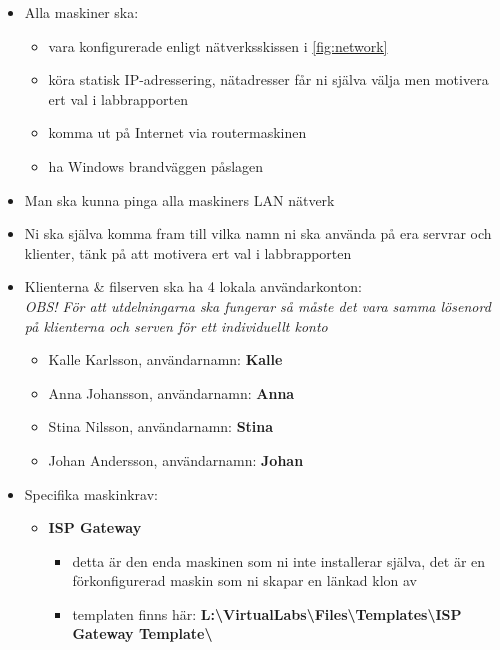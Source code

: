 \documentclass[paper=a4, fontsize=11pt]{report} %
\begin{document}
\begin{itemize}
    \item Alla maskiner ska:
    \begin{itemize}
        \item vara konfigurerade enligt nätverksskissen i \figurename \ref{fig:network}
        \item köra statisk IP-adressering, nätadresser får ni själva välja men motivera ert val i labbrapporten
        \item komma ut på Internet via routermaskinen
        \item ha Windows brandväggen påslagen
    \end{itemize}
    \item Man ska kunna pinga alla maskiners LAN nätverk
    \item Ni ska själva komma fram till vilka namn ni ska använda på era servrar och klienter, tänk på att motivera ert val i labbrapporten
    \item Klienterna \& filserven ska ha 4 lokala användarkonton: \\ \textit{OBS! För att utdelningarna ska fungerar så måste det vara samma lösenord på klienterna och serven för ett individuellt konto}
    \begin{itemize}
        \item Kalle Karlsson, användarnamn: \textbf{Kalle}
        \item Anna Johansson, användarnamn: \textbf{Anna}
        \item Stina Nilsson, användarnamn: \textbf{Stina}
        \item Johan Andersson, användarnamn: \textbf{Johan}
    \end{itemize}
    \item Specifika maskinkrav:
    \begin{itemize}
        \item \textbf{ISP Gateway}
        \begin{itemize}
            \item detta är den enda maskinen som ni inte installerar själva, det är en förkonfigurerad maskin som ni skapar en länkad klon av
            \item templaten finns här: \textbf{L:\textbackslash VirtualLabs\textbackslash Files\textbackslash Templates\textbackslash ISP Gateway Template\textbackslash }
        \end{itemize}


\end{itemize}
\end{itemize}
\end{document}
